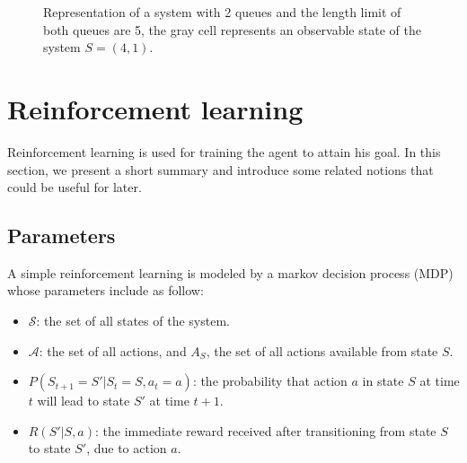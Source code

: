 \documentclass[
  a4paper, xcolor = usenames,dvipsnames]{article}
\providecommand{\tightlist}{%
  \setlength{\itemsep}{0pt}\setlength{\parskip}{0pt}}
\theoremstyle{definition}
\theoremstyle{definition}
\theoremstyle{definition}
\theoremstyle{definition}
\theoremstyle{remark}
\begin{document}
\begin{figure}
\centering
\def\mycolumns{5}
\def\myrows{5}
\caption[Representation of a system with 2 queues]{Representation of a system with 2 queues and the length limit of both queues are 5, the gray cell represents an observable state of the system $S = (4, 1).$}
\end{figure}

\hypertarget{reinforcement-learning}{%
\section{Reinforcement learning}\label{reinforcement-learning}}

Reinforcement learning is used for training the agent to attain his goal. In this section, we present a short summary and introduce some related notions that could be useful for later.

\hypertarget{parameters-2}{%
\subsection{Parameters}\label{parameters-2}}

A simple reinforcement learning is modeled by a markov decision process (MDP) whose parameters include as follow:

\begin{itemize}
\tightlist
\item
  \(\mathcal{S}\): the set of all states of the system.
\item
  \(\mathcal{A}\): the set of all actions, and \(A_{S}\), the set of all actions available from state \(S\).
\item
  \(P(S_{t + 1} = S' | S_{t} = S, a_{t} = a)\): the probability that action \(a\) in state \(S\) at time \(t\) will lead to state \(S'\) at time \(t + 1\).
\item
  \(R(S' | S, a)\): the immediate reward received after transitioning from state \(S\) to state \(S'\), due to action \(a\).
\end{itemize}
\end{document}
